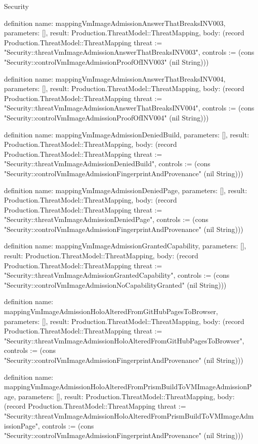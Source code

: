 \begin{lexlean}{Security}
\begin{semanticmodule}
definition{
  name: mappingVmImageAdmissionAnswerThatBreaksINV003,
  parameters: [],
  result: Production.ThreatModel::ThreatMapping,
  body: (record Production.ThreatModel::ThreatMapping {threat := "Security::threatVmImageAdmissionAnswerThatBreaksINV003", controls := (cons "Security::controlVmImageAdmissionProofOfINV003" (nil String))})
}

definition{
  name: mappingVmImageAdmissionAnswerThatBreaksINV004,
  parameters: [],
  result: Production.ThreatModel::ThreatMapping,
  body: (record Production.ThreatModel::ThreatMapping {threat := "Security::threatVmImageAdmissionAnswerThatBreaksINV004", controls := (cons "Security::controlVmImageAdmissionProofOfINV004" (nil String))})
}

definition{
  name: mappingVmImageAdmissionDeniedBuild,
  parameters: [],
  result: Production.ThreatModel::ThreatMapping,
  body: (record Production.ThreatModel::ThreatMapping {threat := "Security::threatVmImageAdmissionDeniedBuild", controls := (cons "Security::controlVmImageAdmissionFingerprintAndProvenance" (nil String))})
}

definition{
  name: mappingVmImageAdmissionDeniedPage,
  parameters: [],
  result: Production.ThreatModel::ThreatMapping,
  body: (record Production.ThreatModel::ThreatMapping {threat := "Security::threatVmImageAdmissionDeniedPage", controls := (cons "Security::controlVmImageAdmissionFingerprintAndProvenance" (nil String))})
}

definition{
  name: mappingVmImageAdmissionGrantedCapability,
  parameters: [],
  result: Production.ThreatModel::ThreatMapping,
  body: (record Production.ThreatModel::ThreatMapping {threat := "Security::threatVmImageAdmissionGrantedCapability", controls := (cons "Security::controlVmImageAdmissionNoCapabilityGranted" (nil String))})
}

definition{
  name: mappingVmImageAdmissionHoloAlteredFromGitHubPagesToBrowser,
  parameters: [],
  result: Production.ThreatModel::ThreatMapping,
  body: (record Production.ThreatModel::ThreatMapping {threat := "Security::threatVmImageAdmissionHoloAlteredFromGitHubPagesToBrowser", controls := (cons "Security::controlVmImageAdmissionFingerprintAndProvenance" (nil String))})
}

definition{
  name: mappingVmImageAdmissionHoloAlteredFromPrismBuildToVMImageAdmissionPage,
  parameters: [],
  result: Production.ThreatModel::ThreatMapping,
  body: (record Production.ThreatModel::ThreatMapping {threat := "Security::threatVmImageAdmissionHoloAlteredFromPrismBuildToVMImageAdmissionPage", controls := (cons "Security::controlVmImageAdmissionFingerprintAndProvenance" (nil String))})
}


\end{semanticmodule}
\end{lexlean}
